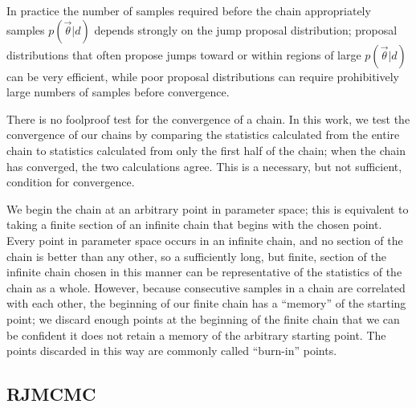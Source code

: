 \documentclass[prd,preprint]{revtex4}
\newcommand{\vtheta}{\vec{\theta}}
\begin{document}
In practice the number of samples required before the chain
appropriately samples $p(\vtheta|d)$ depends strongly on the jump
proposal distribution; proposal distributions that often propose jumps
toward or within regions of large $p(\vtheta|d)$ can be very
efficient, while poor proposal distributions can require prohibitively
large numbers of samples before convergence.  

There is no foolproof test for the convergence of a chain.  In this
work, we test the convergence of our chains by comparing the
statistics calculated from the entire chain to statistics calculated
from only the first half of the chain; when the chain has converged,
the two calculations agree.  This is a necessary, but not sufficient,
condition for convergence.

We begin the chain at an arbitrary point in parameter space; this is
equivalent to taking a finite section of an infinite chain that begins
with the chosen point.  Every point in parameter space occurs in an
infinite chain, and no section of the chain is better than any other,
so a sufficiently long, but finite, section of the infinite chain
chosen in this manner can be representative of the statistics of the
chain as a whole.  However, because consecutive samples in a chain are
correlated with each other, the beginning of our finite chain has a
``memory'' of the starting point; we discard enough points at the
beginning of the finite chain that we can be confident it does not
retain a memory of the arbitrary starting point.  The points discarded
in this way are commonly called ``burn-in'' points.

\subsection{RJMCMC}
\end{document}
